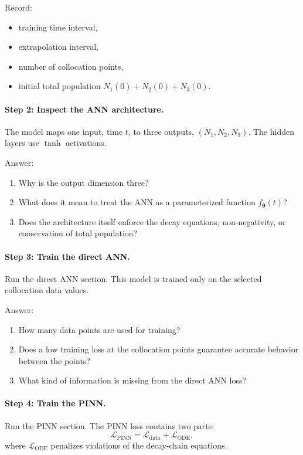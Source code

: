 \documentclass[11pt]{article}
\begin{document}
Record:
\begin{itemize}
    \item training time interval,
    \item extrapolation interval,
    \item number of collocation points,
    \item initial total population \(N_1(0)+N_2(0)+N_3(0)\).
\end{itemize}

\paragraph{Step 2: Inspect the ANN architecture.}
The model maps one input, time \(t\), to three outputs, \((N_1,N_2,N_3)\). The hidden layers use \(\tanh\) activations.

Answer:
\begin{enumerate}
    \item Why is the output dimension three?
    \item What does it mean to treat the ANN as a parameterized function \(f_{\bm{\theta}}(t)\)?
    \item Does the architecture itself enforce the decay equations, non-negativity, or conservation of total population?
\end{enumerate}

\paragraph{Step 3: Train the direct ANN.}
Run the direct ANN section. This model is trained only on the selected collocation data values.

Answer:
\begin{enumerate}
    \item How many data points are used for training?
    \item Does a low training loss at the collocation points guarantee accurate behavior between the points?
    \item What kind of information is missing from the direct ANN loss?
\end{enumerate}

\paragraph{Step 4: Train the PINN.}
Run the PINN section. The PINN loss contains two parts:
\[
\mathcal{L}_{\mathrm{PINN}}
=
\mathcal{L}_{\mathrm{data}}
+
\mathcal{L}_{\mathrm{ODE}},
\]
where \(\mathcal{L}_{\mathrm{ODE}}\) penalizes violations of the decay-chain equations.
\end{document}
